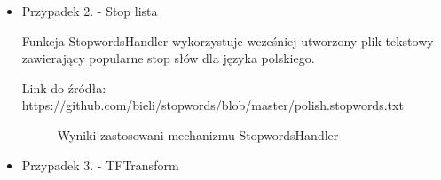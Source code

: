 \documentclass{classrep}
\begin{document}
\begin{itemize}
 \item  Przypadek 2. - Stop lista
    
    Funkcja StopwordsHandler wykorzystuje wcześniej utworzony plik tekstowy zawierający popularne stop słów dla języka polskiego. 
    
    Link do źródła: https://github.com/bieli/stopwords/blob/master/polish.stopwords.txt
    \begin{table}[H]
    \centering
    \caption{Parametry zastosowanego filtra StringToWordVector dla przypadku 2.}
    \label{tab:apriori_num_params}
    \end{table}
   
    \begin{figure}[H] 
    	\begin{center}
        \caption{Wyniki zastosowani mechanizmu StopwordsHandler}
        \label{StopwordsHandler_before}
    	\end{center}
    \end{figure}   
  


 \item  Przypadek 3. - TFTransform
    
    \begin{table}[H]
    \centering
    \caption{Parametry zastosowanego filtra StringToWordVector dla przypadku 3.}
    \label{tab:apriori_num_params}
    \end{table}
   

\end{itemize}
\end{document}
